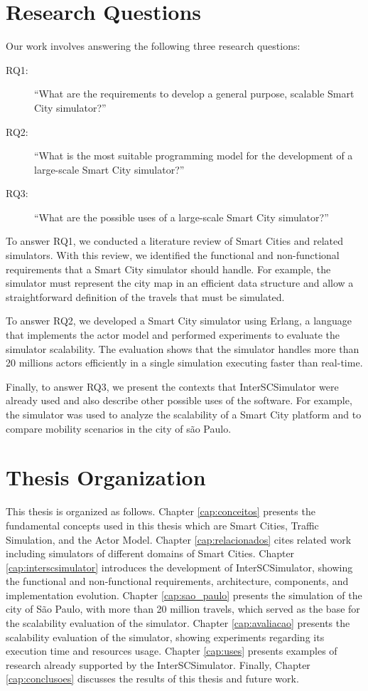 \section{Research Questions}

Our work involves answering the following three research questions:

\begin{description}
\item[RQ1:] ``What are the requirements to develop a general purpose, scalable Smart City simulator?''
\item[RQ2:] ``What is the most suitable programming model for the development of a large-scale Smart City simulator?''
\item[RQ3:] ``What are the possible uses of a large-scale Smart City simulator?''
\end{description}

To answer RQ1, we conducted a literature review of Smart Cities and related simulators. With this review, we identified the functional and non-functional requirements that a Smart City simulator should handle. For example, the simulator must represent the city map in an efficient data structure and allow a straightforward definition of the travels that must be simulated. 

To answer RQ2, we developed a Smart City simulator using Erlang, a language that implements the actor model and performed experiments to evaluate the simulator scalability. The evaluation shows that the simulator handles more than 20  millions actors efficiently in a single simulation executing faster than real-time.

Finally, to answer RQ3, we present the contexts that InterSCSimulator were already used and also describe other possible uses of the software. For example, the simulator was used to analyze the scalability of a Smart City platform and to compare mobility scenarios in the city of s\~ao Paulo.

\section{Thesis Organization}
\label{sec:organizacao_trabalho}

This thesis is organized as follows. Chapter \ref{cap:conceitos} presents the fundamental concepts used in this thesis which are Smart Cities, Traffic Simulation, and the Actor Model. Chapter \ref{cap:relacionados} cites related work including simulators of different domains of Smart Cities. Chapter \ref{cap:interscsimulator} introduces the development of InterSCSimulator, showing the functional and non-functional requirements, architecture, components, and implementation evolution. Chapter \ref{cap:sao_paulo} presents the simulation of the city of S\~ao Paulo, with more than 20 million travels, which served as the base for the scalability evaluation of the simulator. Chapter \ref{cap:avaliacao} presents the scalability evaluation of the simulator, showing experiments regarding its execution time and resources usage. Chapter \ref{cap:uses} presents examples of research already supported by the InterSCSimulator. Finally, Chapter \ref{cap:conclusoes} discusses the results of this thesis and future work.
